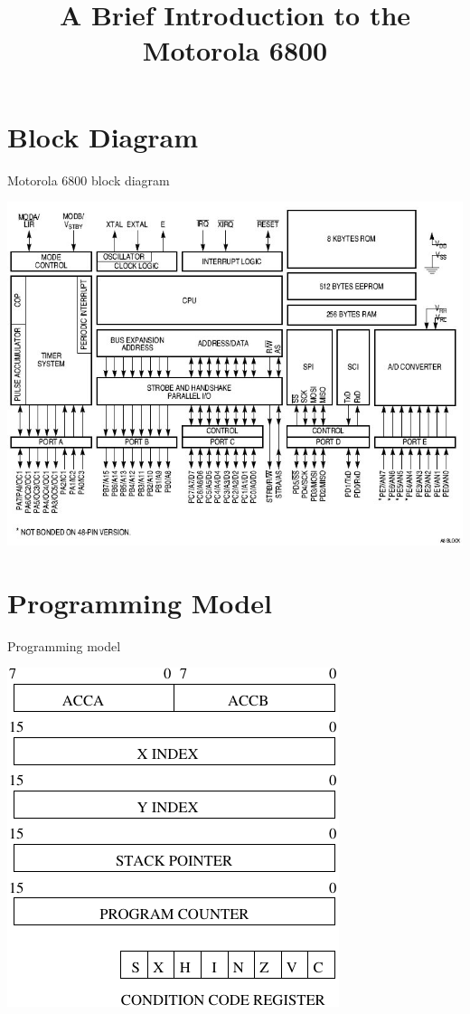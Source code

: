 \title{A Brief Introduction to the Motorola 6800}


\section{Block Diagram}

\begin{frame}{Motorola 6800 block diagram}
  \begin{center}
    \includegraphics[scale=0.3]{6800_block_diagram.jpg}
  \end{center}
\end{frame}

\section{Programming Model}

\begin{frame}{Programming model}
  \begin{center}
    \includegraphics{6800Registers}
  \end{center}
\end{frame}

